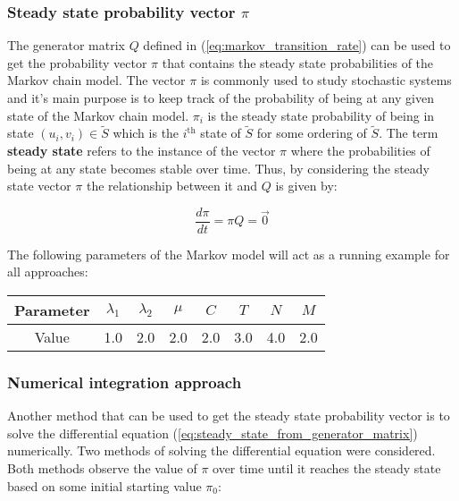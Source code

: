 \subsubsection{Steady state probability vector \(\pi\)}
\label{sec:steady_state_probabilities}

The generator matrix \( Q \) defined in (\ref{eq:markov_transition_rate}) can
be used to get the probability vector \( \pi \) that contains the steady state
probabilities of the Markov chain model.
The vector \( \pi \) is commonly used to study stochastic systems and it's main
purpose is to keep track of the probability of being at any given state of
the Markov chain model.
\(\pi_i\) is the steady state probability of being in state \((u_i, v_i) \in
\tilde S\) which is the \(i^{\text{th}}\) state of \(\tilde S\) for some
ordering of \(\tilde S\).
The term \textbf{steady state} refers to the instance of the vector \( \pi \)
where the probabilities of being at any state becomes stable over time.
Thus, by considering the steady state vector \( \pi \) the relationship between
it and \( Q \) is given by:

\begin{equation}\label{eq:steady_state_from_generator_matrix}
    \frac{d\pi}{dt} = \pi Q = \vec{0}
\end{equation}

The following parameters of the Markov model will act as a running example for
all approaches:

\begin{center}
    \begin{tabular}{|c|c|c|c|c|c|c|c|}
        \hline
        Parameter & \(\lambda_1\) & \(\lambda_2\) & \(\mu\) & \(C\) & \(T\)
        & \(N\) & \(M\) \\
        \hline
        Value & 1.0 & 2.0 & 2.0 & 2.0 & 3.0 & 4.0 & 2.0 \\
        \hline
    \end{tabular}
\end{center}


\subsubsection{Numerical integration approach}

Another method that can be used to get the steady state probability vector is
to solve the differential equation 
(\ref{eq:steady_state_from_generator_matrix}) numerically.
Two methods of solving the differential equation were considered.
Both methods observe the value of \(\pi\) over time until it
reaches the steady state based on some initial starting value \(\pi_0\):

